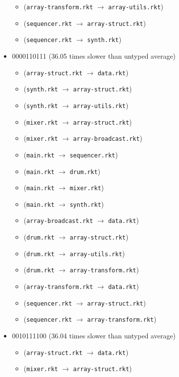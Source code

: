 \documentclass{article}
\newcommand{\mono}[1]{\texttt{#1}}
\begin{document}
\begin{itemize}
\begin{itemize}
  \item (\mono{array-transform.rkt} $\rightarrow$ \mono{array-utils.rkt})
  \item (\mono{sequencer.rkt} $\rightarrow$ \mono{array-struct.rkt})
  \item (\mono{sequencer.rkt} $\rightarrow$ \mono{synth.rkt})
  \end{itemize}
\item 0000110111 (36.05 times slower than untyped average)
  \begin{itemize}
  \item (\mono{array-struct.rkt} $\rightarrow$ \mono{data.rkt})
  \item (\mono{synth.rkt} $\rightarrow$ \mono{array-struct.rkt})
  \item (\mono{synth.rkt} $\rightarrow$ \mono{array-utils.rkt})
  \item (\mono{mixer.rkt} $\rightarrow$ \mono{array-struct.rkt})
  \item (\mono{mixer.rkt} $\rightarrow$ \mono{array-broadcast.rkt})
  \item (\mono{main.rkt} $\rightarrow$ \mono{sequencer.rkt})
  \item (\mono{main.rkt} $\rightarrow$ \mono{drum.rkt})
  \item (\mono{main.rkt} $\rightarrow$ \mono{mixer.rkt})
  \item (\mono{main.rkt} $\rightarrow$ \mono{synth.rkt})
  \item (\mono{array-broadcast.rkt} $\rightarrow$ \mono{data.rkt})
  \item (\mono{drum.rkt} $\rightarrow$ \mono{array-struct.rkt})
  \item (\mono{drum.rkt} $\rightarrow$ \mono{array-utils.rkt})
  \item (\mono{drum.rkt} $\rightarrow$ \mono{array-transform.rkt})
  \item (\mono{array-transform.rkt} $\rightarrow$ \mono{data.rkt})
  \item (\mono{sequencer.rkt} $\rightarrow$ \mono{array-struct.rkt})
  \item (\mono{sequencer.rkt} $\rightarrow$ \mono{array-transform.rkt})
  \end{itemize}
\item 0010111100 (36.04 times slower than untyped average)
  \begin{itemize}
  \item (\mono{array-struct.rkt} $\rightarrow$ \mono{data.rkt})
  \item (\mono{mixer.rkt} $\rightarrow$ \mono{array-struct.rkt})

\end{itemize}
\end{itemize}
\end{document}
